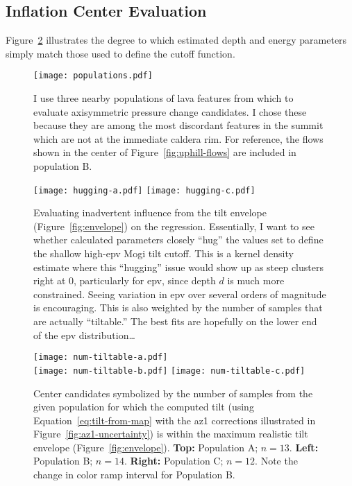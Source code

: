 \subsection{Inflation Center Evaluation}

Figure~\ref{fig:hugging} illustrates the degree to which estimated depth and energy parameters simply match those used to define the cutoff function.

\begin{figure}
    \texttt{[image: populations.pdf]}%
    \caption[Sample populations for inflation center evaluation]{I use three nearby populations of lava features from which to evaluate axisymmetric pressure change candidates. I chose these because they are among the most discordant features in the summit which are not at the immediate caldera rim. For reference, the flows shown in the center of Figure~\ref{fig:uphill-flows} are included in population B.}%
    \label{fig:populations}
\end{figure}

\begin{figure}
    \texttt{[image: hugging-a.pdf]}
    \texttt{[image: hugging-c.pdf]}
    \caption[Check for envelope ``hugging'']{Evaluating inadvertent influence from the tilt envelope (Figure~\ref{fig:envelope}) on the regression. Essentially, I want to see whether calculated parameters closely ``hug'' the values set to define the shallow high-\acs{epv} Mogi tilt cutoff. This is a kernel density estimate where this ``hugging'' issue would show up as steep clusters right at 0, particularly for \acs{epv}, since depth $d$ is much more constrained. Seeing variation in \acs{epv} over several orders of magnitude is encouraging. This is also weighted by the number of samples that are actually ``tiltable.'' The best fits are hopefully on the lower end of the \acs{epv} distribution\dots} 
    \label{fig:hugging}
\end{figure}

 \begin{figure}
    \begin{center}
     \texttt{[image: num-tiltable-a.pdf]}\\
     \texttt{[image: num-tiltable-b.pdf]}%
     \texttt{[image: num-tiltable-c.pdf]}
     \caption[Inflation center candidates by number of ``tiltable'' samples]{Center candidates symbolized by the number of samples from the given population for which the computed tilt (using Equation~\eqref{eq:tilt-from-map} with the \acs{az1} corrections illustrated in Figure~\ref{fig:az1-uncertainty}) is within the maximum realistic tilt envelope (Figure~\ref{fig:envelope}). \textbf{Top:} Population A; $n=13$. \textbf{Left:} Population B; $n=14$. \textbf{Right:} Population C; $n=12$. Note the change in color ramp interval for Population B.} 
     \label{fig:num-tiltable}
    \end{center}
\end{figure}

